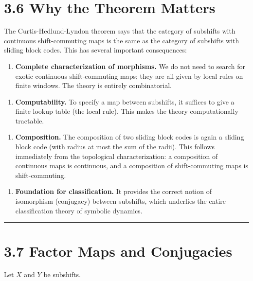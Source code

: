 \section{3.6 Why the Theorem Matters}

The Curtis-Hedlund-Lyndon theorem says that the category of subshifts with continuous shift-commuting maps is the same as the category of subshifts with sliding block codes. This has several important consequences:

\begin{enumerate}
  \item \textbf{Complete characterization of morphisms.} We do not need to search for exotic continuous shift-commuting maps; they are all given by local rules on finite windows. The theory is entirely combinatorial.
\end{enumerate}

\begin{enumerate}
  \item \textbf{Computability.} To specify a map between subshifts, it suffices to give a finite lookup table (the local rule). This makes the theory computationally tractable.
\end{enumerate}

\begin{enumerate}
  \item \textbf{Composition.} The composition of two sliding block codes is again a sliding block code (with radius at most the sum of the radii). This follows immediately from the topological characterization: a composition of continuous maps is continuous, and a composition of shift-commuting maps is shift-commuting.
\end{enumerate}

\begin{enumerate}
  \item \textbf{Foundation for classification.} It provides the correct notion of isomorphism (conjugacy) between subshifts, which underlies the entire classification theory of symbolic dynamics.
\end{enumerate}

\bigskip\hrule\bigskip

\section{3.7 Factor Maps and Conjugacies}

\begin{definition}
Let $X$ and $Y$ be subshifts.
\end{definition}

